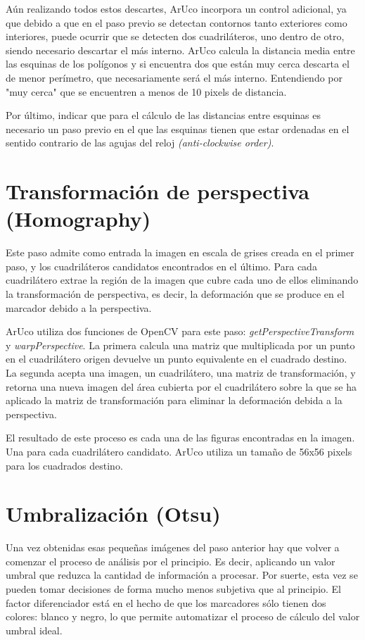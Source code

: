 \documentclass[10pt,a4paper]{article}
\begin{document}
Aún realizando todos estos descartes, ArUco incorpora un control adicional, ya que debido a que en el paso previo se detectan contornos tanto exteriores como interiores, puede ocurrir que se detecten dos cuadriláteros, uno dentro de otro, siendo necesario descartar el más interno. ArUco calcula la distancia media entre las esquinas de los polígonos y si encuentra dos que están muy cerca descarta el de menor perímetro, que necesariamente será el más interno. Entendiendo por "muy cerca" que se encuentren a menos de 10 pixels de distancia.

Por último, indicar que para el cálculo de las distancias entre esquinas es necesario un paso previo en el que las esquinas tienen que estar ordenadas en el sentido contrario de las agujas del reloj  \textit{(anti-clockwise order)}.

\section{Transformación de perspectiva (Homography)}
Este paso admite como entrada la imagen en escala de grises creada en el primer paso, y los cuadriláteros candidatos encontrados en el último. Para cada cuadrilátero extrae la región de la imagen que cubre cada uno de ellos eliminando la transformación de perspectiva, es decir, la deformación que se produce en el marcador debido a la perspectiva.

ArUco utiliza dos funciones de OpenCV para este paso: \textit{getPerspectiveTransform} y \textit{warpPerspective}. La primera calcula una matriz que multiplicada por un punto en el cuadrilátero origen devuelve un punto equivalente en el cuadrado destino. La segunda acepta una imagen, un cuadrilátero, una matriz de transformación, y retorna una nueva imagen del área cubierta por el cuadrilátero sobre la que se ha aplicado la matriz de transformación para eliminar la deformación debida a la perspectiva. 

El resultado de este proceso es cada una de las figuras encontradas en la imagen. Una para cada cuadrilátero candidato. ArUco utiliza un tamaño de 56x56 pixels para los cuadrados destino.

\section{Umbralización (Otsu)}
Una vez obtenidas esas pequeñas imágenes del paso anterior hay que volver a comenzar el proceso de análisis por el principio. Es decir, aplicando un valor umbral que reduzca la cantidad de información a procesar. Por suerte, esta vez se pueden tomar decisiones de forma mucho menos subjetiva que al principio. El factor diferenciador está en el hecho de que los marcadores sólo tienen dos colores: blanco y negro, lo que permite automatizar el proceso de cálculo del valor umbral ideal.
\end{document}
